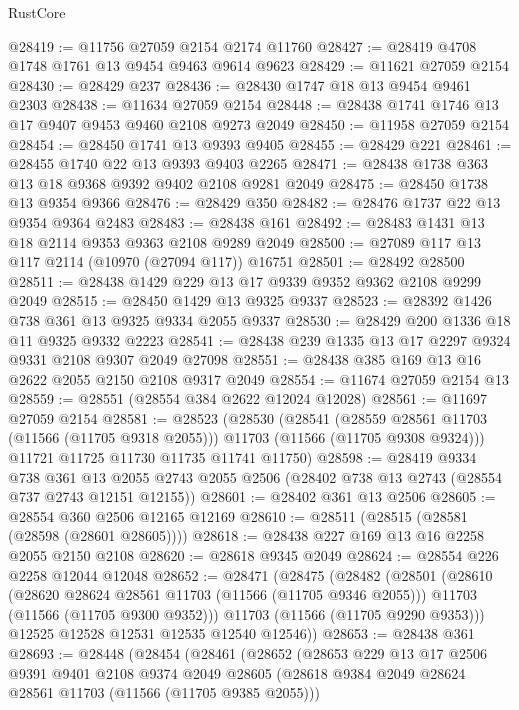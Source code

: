 \begin{lexlean}{RustCore}
\begin{coremodule}
@28419 := @11756 @27059 @2154 @2174 @11760
@28427 := @28419 @4708 @1748 @1761 @13 @9454 @9463 @9614 @9623
@28429 := @11621 @27059 @2154
@28430 := @28429 @237
@28436 := @28430 @1747 @18 @13 @9454 @9461 @2303
@28438 := @11634 @27059 @2154
@28448 := @28438 @1741 @1746 @13 @17 @9407 @9453 @9460 @2108 @9273 @2049
@28450 := @11958 @27059 @2154
@28454 := @28450 @1741 @13 @9393 @9405
@28455 := @28429 @221
@28461 := @28455 @1740 @22 @13 @9393 @9403 @2265
@28471 := @28438 @1738 @363 @13 @18 @9368 @9392 @9402 @2108 @9281 @2049
@28475 := @28450 @1738 @13 @9354 @9366
@28476 := @28429 @350
@28482 := @28476 @1737 @22 @13 @9354 @9364 @2483
@28483 := @28438 @161
@28492 := @28483 @1431 @13 @18 @2114 @9353 @9363 @2108 @9289 @2049
@28500 := @27089 @117 @13 @117 @2114 (@10970 (@27094 @117)) @16751
@28501 := @28492 @28500
@28511 := @28438 @1429 @229 @13 @17 @9339 @9352 @9362 @2108 @9299 @2049
@28515 := @28450 @1429 @13 @9325 @9337
@28523 := @28392 @1426 @738 @361 @13 @9325 @9334 @2055 @9337
@28530 := @28429 @200 @1336 @18 @11 @9325 @9332 @2223
@28541 := @28438 @239 @1335 @13 @17 @2297 @9324 @9331 @2108 @9307 @2049 @27098
@28551 := @28438 @385 @169 @13 @16 @2622 @2055 @2150 @2108 @9317 @2049
@28554 := @11674 @27059 @2154 @13
@28559 := @28551 (@28554 @384 @2622 @12024 @12028)
@28561 := @11697 @27059 @2154
@28581 := @28523
    (@28530
      (@28541
        (@28559 @28561 @11703 (@11566 (@11705 @9318 @2055)))
        @11703
        (@11566 (@11705 @9308 @9324)))
      @11721
      @11725
      @11730
      @11735
      @11741
      @11750)
@28598 := @28419
    @9334
    @738
    @361
    @13
    @2055
    @2743
    @2055
    @2506
    (@28402 @738 @13 @2743 (@28554 @737 @2743 @12151 @12155))
@28601 := @28402 @361 @13 @2506
@28605 := @28554 @360 @2506 @12165 @12169
@28610 := @28511 (@28515 (@28581 (@28598 (@28601 @28605))))
@28618 := @28438 @227 @169 @13 @16 @2258 @2055 @2150 @2108
@28620 := @28618 @9345 @2049
@28624 := @28554 @226 @2258 @12044 @12048
@28652 := @28471
    (@28475
      (@28482
        (@28501
          (@28610
            (@28620 @28624 @28561 @11703 (@11566 (@11705 @9346 @2055)))
            @11703
            (@11566 (@11705 @9300 @9352)))
          @11703
          (@11566 (@11705 @9290 @9353)))
        @12525
        @12528
        @12531
        @12535
        @12540
        @12546))
@28653 := @28438 @361
@28693 := @28448
    (@28454
      (@28461
        (@28652
          (@28653
            @229
            @13
            @17
            @2506
            @9391
            @9401
            @2108
            @9374
            @2049
            @28605
            (@28618 @9384 @2049 @28624 @28561 @11703 (@11566 (@11705 @9385 @2055)))

\end{coremodule}
\end{lexlean}
